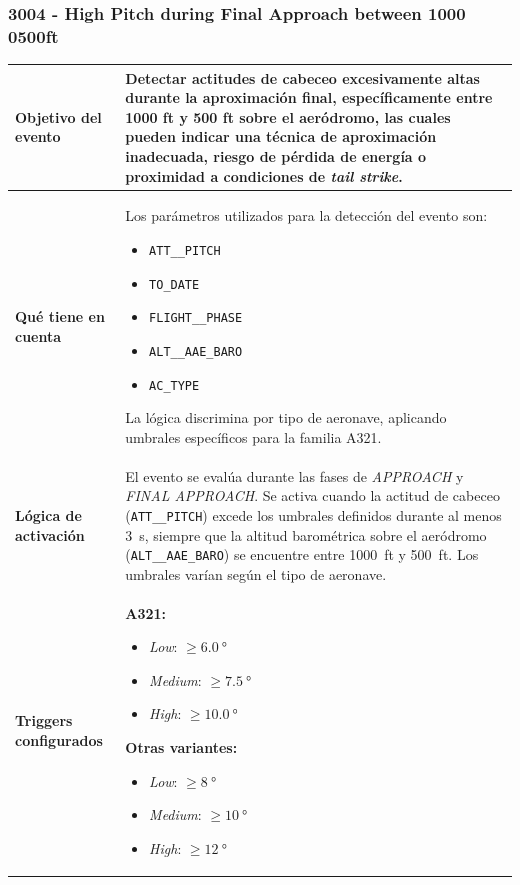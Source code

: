 \documentclass[11pt,a4paper]{article}
\begin{document}
	\subsubsection{3004 - High Pitch during Final Approach between 1000 0500ft}
	
	\begin{longtable}{p{5cm} p{9.5cm}}
		\hline
		\textbf{Objetivo del evento} &
		Detectar actitudes de cabeceo excesivamente altas durante la aproximación final, específicamente entre 1000 ft y 500 ft sobre el aeródromo, las cuales pueden indicar una técnica de aproximación inadecuada, riesgo de pérdida de energía o proximidad a condiciones de \textit{tail strike}. \\
		\hline
		
		\textbf{Qué tiene en cuenta} &
		Los parámetros utilizados para la detección del evento son:
		\begin{itemize}
			\item \texttt{ATT\_\_PITCH}
			\item \texttt{TO\_DATE}
			\item \texttt{FLIGHT\_\_PHASE}
			\item \texttt{ALT\_\_AAE\_BARO}
			\item \texttt{AC\_TYPE}
		\end{itemize}
		La lógica discrimina por tipo de aeronave, aplicando umbrales específicos para la familia A321. \\
		\hline
		
		\textbf{Lógica de activación} &
		El evento se evalúa durante las fases de \textit{APPROACH} y \textit{FINAL APPROACH}.  
		Se activa cuando la actitud de cabeceo (\texttt{ATT\_\_PITCH}) excede los umbrales definidos durante al menos \SI{3}{s}, siempre que la altitud barométrica sobre el aeródromo (\texttt{ALT\_\_AAE\_BARO}) se encuentre entre \SI{1000}{ft} y \SI{500}{ft}.  
		Los umbrales varían según el tipo de aeronave. \\
		\hline
		
		\textbf{Triggers configurados} &
		\textbf{A321:}
		\begin{itemize}
			\item \textit{Low}: \(\geq \SI{6.0}{\degree}\)
			\item \textit{Medium}: \(\geq \SI{7.5}{\degree}\)
			\item \textit{High}: \(\geq \SI{10.0}{\degree}\)
		\end{itemize}
		\textbf{Otras variantes:}
		\begin{itemize}
			\item \textit{Low}: \(\geq \SI{8}{\degree}\)
			\item \textit{Medium}: \(\geq \SI{10}{\degree}\)
			\item \textit{High}: \(\geq \SI{12}{\degree}\)
		\end{itemize} \\
		\hline
		

\end{longtable}
\end{document}
